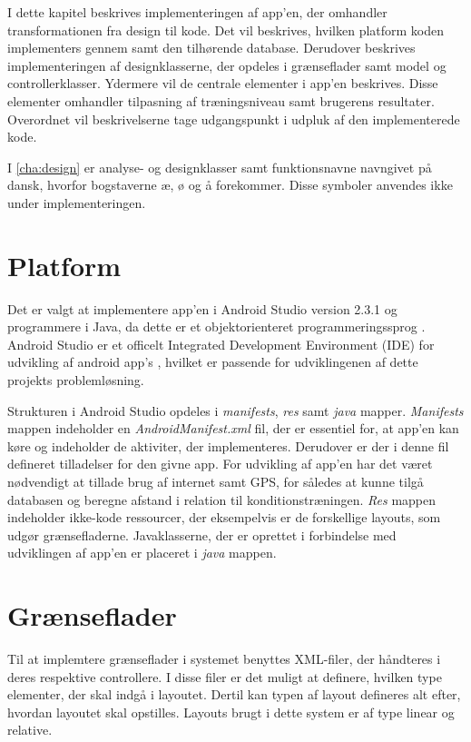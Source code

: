 I dette kapitel beskrives implementeringen af app'en, der omhandler transformationen fra design til kode. Det vil beskrives, hvilken platform koden implementers gennem samt den tilhørende database. Derudover beskrives implementeringen af designklasserne, der opdeles i grænseflader samt model og controllerklasser. Ydermere vil de centrale elementer i app'en beskrives. Disse elementer omhandler tilpasning af træningsniveau samt brugerens resultater. Overordnet vil beskrivelserne tage udgangspunkt i udpluk af den implementerede kode.

I \autoref{cha:design} er analyse- og designklasser samt funktionsnavne navngivet på dansk, hvorfor bogstaverne æ, ø og å forekommer. Disse symboler anvendes ikke under implementeringen.

\section{Platform}
Det er valgt at implementere app'en i Android Studio version 2.3.1 og programmere i Java, da dette er et objektorienteret programmeringssprog \cite{Brahma2015}. Android Studio er et officelt Integrated Development Environment (IDE) for udvikling af android app's \cite{android2017}, hvilket er passende for udviklingenen af dette projekts problemløsning. 

Strukturen i Android Studio opdeles i \textit{manifests}, \textit{res} samt \textit{java} mapper. \textit{Manifests} mappen indeholder en \textit{AndroidManifest.xml} fil, der er essentiel for, at app'en kan køre og indeholder de aktiviter, der implementeres. Derudover er der i denne fil defineret tilladelser for den givne app. For udvikling af app'en har det været nødvendigt at tillade brug af internet samt GPS, for således at kunne tilgå databasen og beregne afstand i relation til konditionstræningen. 
\textit{Res} mappen indeholder ikke-kode ressourcer, der eksempelvis er de forskellige layouts, som udgør grænsefladerne.
Javaklasserne, der er oprettet i forbindelse med udviklingen af app'en er placeret i \textit{java} mappen.\cite{android2017}
 

\section{Grænseflader}
Til at implemtere grænseflader i systemet benyttes XML-filer, der håndteres i deres respektive controllere. I disse filer er det muligt at definere, hvilken type elementer, der skal indgå i layoutet. Dertil kan typen af layout defineres alt efter, hvordan layoutet skal opstilles. Layouts brugt i dette system er af type linear og relative.  


